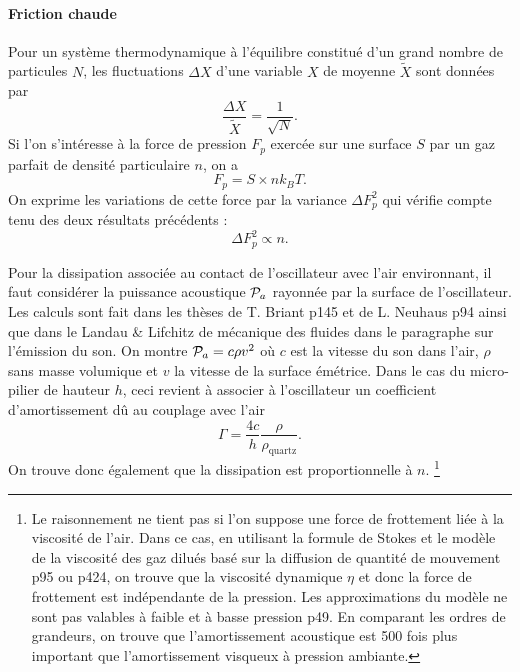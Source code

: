 \documentclass[12pt,a4paper]{article}
\begin{document}
\paragraph{Friction \og chaude\fg{}\\}
Pour un système thermodynamique à l'équilibre constitué d'un grand nombre de particules $N$, les fluctuations $\Delta X$ d'une variable $X$ de moyenne $\tilde{X}$ sont données par
\begin{equation}
\frac{\Delta X}{\tilde{X}} = \frac{1}{\sqrt{N}}.
\end{equation}
Si l'on s'intéresse à la force de pression $F_p$ exercée sur une surface $S$ par un gaz parfait de densité particulaire $n$, on a
\begin{equation}
F_p = S \times n k_B T.
\end{equation}
On exprime les variations de cette force par la variance $\Delta F_p^2$ qui vérifie compte tenu des deux résultats précédents :
\begin{equation}
\Delta F_p^2 \propto n.
\end{equation}

Pour la dissipation associée au contact de l'oscillateur avec l'air environnant, il faut considérer la puissance acoustique ${\cal{P}}_a$ rayonnée par la surface de l'oscillateur.
Les calculs sont fait dans les thèses de T. Briant p145 et de L. Neuhaus p94 ainsi que dans le Landau \& Lifchitz de mécanique des fluides dans le paragraphe sur l'émission du son.
On montre ${\cal{P}}_a = c \rho v^2$ où $c$ est la vitesse du son dans l'air, $\rho$ sans masse volumique et $v$ la vitesse de la surface émétrice. Dans le cas du micro-pilier de hauteur $h$, ceci revient à associer à l'oscillateur un coefficient d'amortissement dû au couplage avec l'air
\begin{equation}
\Gamma = \frac{4c}{h} \frac{\rho}{\rho_\mathrm{quartz}}.
\end{equation}
On trouve donc également que la dissipation est proportionnelle à $n$.
\footnote{Le raisonnement ne tient pas si l'on suppose une force de frottement liée à la viscosité de l'air.
Dans ce cas, en utilisant la formule de Stokes et le modèle de la viscosité des gaz dilués basé sur la diffusion de quantité de mouvement \cite{Guyon2001} p95 ou \cite{Olivier2000} p424, on trouve que la viscosité dynamique $\eta$ et donc la force de frottement est indépendante de la pression.
Les approximations du modèle ne sont pas valables à faible et à basse pression \cite{Guyon2001} p49.
En comparant les ordres de grandeurs, on trouve que l'amortissement acoustique est 500 fois plus important que l'amortissement visqueux à pression ambiante.}
\end{document}

